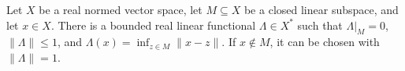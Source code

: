 Let \(X\) be a real normed vector space, let \(M\subseteq X\) be a closed linear subspace, and let \(x\in X\).  There is a bounded real linear functional \(\Lambda\in X^*\) such that \(\Lambda|_M=0\), \(\|\Lambda\|\leq1\), and \(\Lambda(x)=\inf_{z\in M}\|x-z\|\).  If \(x\notin M\), it can be chosen with \(\|\Lambda\|=1\).